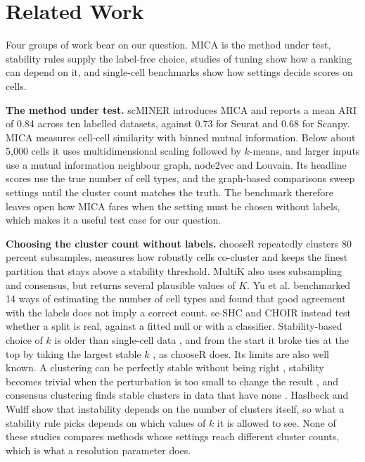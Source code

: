 \section{Related Work}\label{sec:related}
Four groups of work bear on our question. MICA is the method under test, stability rules supply the
label-free choice, studies of tuning show how a ranking can depend on it, and single-cell benchmarks
show how settings decide scores on cells.

\textbf{The method under test.} scMINER \cite{pan2025scminer} introduces MICA and reports a mean ARI of
0.84 across ten labelled datasets, against 0.73 for Seurat and 0.68 for Scanpy. MICA measures cell-cell
similarity with binned mutual information. Below about 5,000 cells it uses multidimensional scaling
followed by $k$-means, and larger inputs use a mutual information neighbour graph, node2vec and Louvain.
Its headline scores use the true number of cell types, and the graph-based comparisons sweep settings
until the cluster count matches the truth. The benchmark therefore leaves open how MICA fares when the
setting must be chosen without labels, which makes it a useful test case for our question.

\textbf{Choosing the cluster count without labels.} chooseR \cite{pattersoncross2021chooser} repeatedly
clusters 80 percent subsamples, measures how robustly cells co-cluster and keeps the finest partition
that stays above a stability threshold. MultiK \cite{liu2021multik} also uses subsampling and consensus,
but returns several plausible values of $K$. Yu et al. \cite{yu2022benchmarking} benchmarked 14 ways of
estimating the number of cell types and found that good agreement with the labels does not imply a
correct count. sc-SHC \cite{grabski2023significance} and CHOIR \cite{sant2025choir} instead test whether
a split is real, against a fitted null or with a classifier. Stability-based choice of $k$ is older than single-cell
data \cite{BenHur2002Stability,Lange2004Stability}, and from the start it broke ties at the top by
taking the largest stable $k$ \cite{BenHur2002Stability,Tibshirani2005Prediction}, as chooseR does. Its
limits are also well known. A clustering can be perfectly stable without being right \cite{BenDavid2006Sober},
stability becomes trivial when the perturbation is too small to change the result
\cite{vonLuxburg2010Stability}, and consensus clustering finds stable clusters in data that have none
\cite{Senbabaoglu2014Critical}. Haslbeck and Wulff \cite{Haslbeck2020Corrected} show that instability
depends on the number of clusters itself, so what a stability rule picks depends on which values of $k$
it is allowed to see. None of these studies compares methods whose settings reach different cluster
counts, which is what a resolution parameter does.

